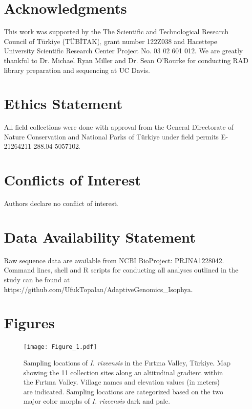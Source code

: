 \documentclass[9pt,a4paper,twoside]{rho-class/rho}
\begin{document}
\section{Acknowledgments}
This work was supported by the The Scientific and Technological Research Council of Türkiye (TÜBİTAK), grant number 122Z038 and Hacettepe University Scientific Research Center Project No. 03 02 601 012. We are greatly thankful to Dr. Michael Ryan Miller and Dr. Sean O'Rourke for conducting RAD library preparation and sequencing at UC Davis.  

\section{Ethics Statement}
All field collections were done with approval from the General Directorate of Nature Conservation and National Parks of Türkiye under field permits E-21264211-288.04-5057102.

\section{Conflicts of Interest}
Authors declare no conflict of interest.

\section{Data Availability Statement}
Raw sequence data are available from NCBI BioProject: PRJNA1228042. Command lines, shell and R scripts for conducting all analyses outlined in the study can be found at https://github.com/UfukTopalan/AdaptiveGenomics\_Isophya.

\printbibliography
\clearpage\section{Figures}
\begin{figure}[h]
\centering
\texttt{[image: Figure\_1.pdf]}
\caption{Sampling locations of \textit{I. rizeensis} in the Fırtına Valley, Türkiye. Map showing the 11 collection sites along an altitudinal gradient within the Fırtına Valley. Village names and elevation values (in meters) are indicated. Sampling locations are categorized based on the two major color morphs of \textit{I. rizeensis} dark and pale.}
\label{Figure 1}
\end{figure}
\end{document}
